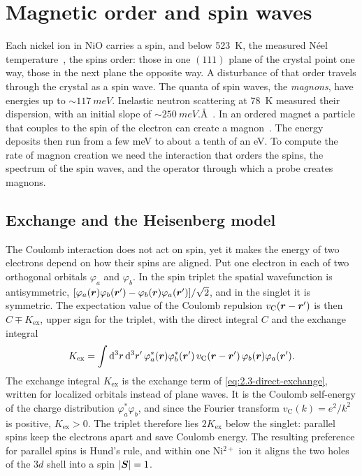 \section{Magnetic order and spin waves}\label{sec:7.1}

Each nickel ion in NiO carries a spin, and below \SI{523}{K}, the measured Néel temperature~\cite[Table~IV]{fischer2009exchange}, the spins order: those in one $(111)$ plane of the crystal point one way, those in the next plane the opposite way. A disturbance of that order travels through the crystal as a spin wave. The quanta of spin waves, the \emph{magnons}, have energies up to ${\sim}\SI{117}{meV}$. Inelastic neutron scattering at \SI{78}{K} measured their dispersion, with an initial slope of ${\sim}\SI{250}{meV.\angstrom}$~\cite{hutchings1972measurement}. In an ordered magnet a particle that couples to the spin of the electron can create a magnon~\cite{trickle2020detecting}. The energy deposits then run from a few meV to about a tenth of an eV. To compute the rate of magnon creation we need the interaction that orders the spins, the spectrum of the spin waves, and the operator through which a probe creates magnons.

\subsection{Exchange and the Heisenberg model}

The Coulomb interaction does not act on spin, yet it makes the energy of two electrons depend on how their spins are aligned. Put one electron in each of two orthogonal orbitals $\varphi_a$ and $\varphi_b$. In the spin triplet the spatial wavefunction is antisymmetric, $[\varphi_a(\bm{r})\varphi_b(\bm{r}') - \varphi_b(\bm{r})\varphi_a(\bm{r}')]/\sqrt2$, and in the singlet it is symmetric. The expectation value of the Coulomb repulsion $v_{\mathrm{C}}(\bm{r} - \bm{r}')$ is then $C \mp K_{\mathrm{ex}}$, upper sign for the triplet, with the direct integral $C$ and the exchange integral
\begin{equation}
  K_{\mathrm{ex}} = \int\mathrm{d}^3r\,\mathrm{d}^3r'\,\varphi_a^*(\bm{r})\varphi_b^*(\bm{r}')\,v_{\mathrm{C}}(\bm{r} - \bm{r}')\,\varphi_b(\bm{r})\varphi_a(\bm{r}') .
  \label{eq:7.1-Kex}
\end{equation}
The exchange integral $K_{\mathrm{ex}}$ is the exchange term of \cref{eq:2.3-direct-exchange}, written for localized orbitals instead of plane waves. It is the Coulomb self-energy of the charge distribution $\varphi_a^*\varphi_b$, and since the Fourier transform $v_{\mathrm{C}}(k) = e^2/k^2$ is positive, $K_{\mathrm{ex}} > 0$. The triplet therefore lies $2K_{\mathrm{ex}}$ below the singlet: parallel spins keep the electrons apart and save Coulomb energy. The resulting preference for parallel spins is Hund's rule, and within one Ni$^{2+}$ ion it aligns the two holes of the $3d$ shell into a spin $|\bm{S}| = 1$.

